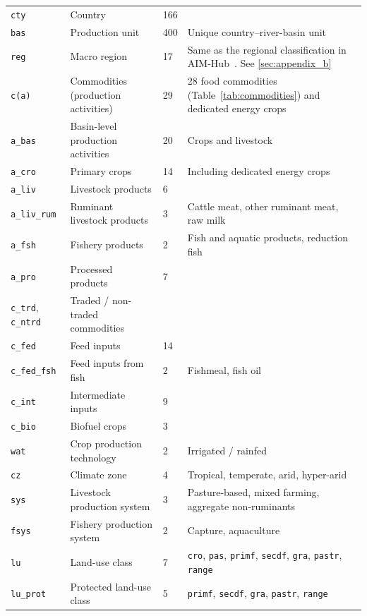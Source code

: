 \begin{xltabular}{\linewidth}{l X l X}
  \texttt{cty}    & Country & 166 & \\
  \texttt{bas}    & Production unit & 400 & Unique country--river-basin unit \\
  \texttt{reg}    & Macro region     & 17  & Same as the regional classification in AIM-Hub~\cite{fujimoriSSP3AIMImplementation2017}. See \cref{sec:appendix_b} \\
  \texttt{c(a)}   & Commodities (production activities) & 29 & 28 food commodities (Table~\ref{tab:commodities}) and dedicated energy crops \\
  \texttt{a\_bas} & Basin-level production activities & 20 & Crops and livestock \\
  \texttt{a\_cro} & Primary crops    & 14  & Including dedicated energy crops \\
  \texttt{a\_liv} & Livestock products & 6 & \\
  \texttt{a\_liv\_rum} & Ruminant livestock products & 3 & Cattle meat, other ruminant meat, raw milk \\
  \texttt{a\_fsh} & Fishery products & 2 & Fish and aquatic products, reduction fish \\
  \texttt{a\_pro} & Processed products & 7 & \\
  \texttt{c\_trd}, \texttt{c\_ntrd} & Traded / non-traded commodities & & \\
  \texttt{c\_fed} & Feed inputs      & 14  & \\
  \texttt{c\_fed\_fsh} & Feed inputs from fish & 2 & Fishmeal, fish oil \\
  \texttt{c\_int} & Intermediate inputs & 9 & \\
  \texttt{c\_bio} & Biofuel crops    & 3   & \\
  \texttt{wat}    & Crop production technology & 2 & Irrigated / rainfed \\
  \texttt{cz}     & Climate zone     & 4 & Tropical, temperate, arid, hyper-arid \\
  \texttt{sys}    & Livestock production system & 3 & Pasture-based, mixed farming, aggregate non-ruminants \\
  \texttt{fsys}   & Fishery production system & 2 & Capture, aquaculture \\
  \texttt{lu}     & Land-use class & 7 & \texttt{cro}, \texttt{pas}, \texttt{primf}, \texttt{secdf}, \texttt{gra}, \texttt{pastr}, \texttt{range} \\
  \texttt{lu\_prot} & Protected land-use class & 5 & \texttt{primf}, \texttt{secdf}, \texttt{gra}, \texttt{pastr}, \texttt{range} \\

\end{xltabular}
